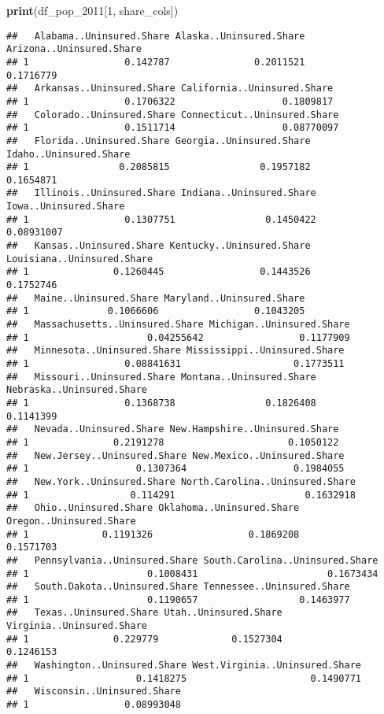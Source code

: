 \documentclass[
]{article}
\newenvironment{Shaded}{\begin{snugshade}}{\end{snugshade}}
\newcommand{\DecValTok}[1]{\textcolor[rgb]{0.00,0.00,0.81}{#1}}
\newcommand{\FunctionTok}[1]{\textcolor[rgb]{0.13,0.29,0.53}{\textbf{#1}}}
\newcommand{\NormalTok}[1]{#1}
\begin{document}
\begin{Shaded}
\begin{Highlighting}[]
\FunctionTok{print}\NormalTok{(df\_pop\_2011[}\DecValTok{1}\NormalTok{, share\_cols])}
\end{Highlighting}
\end{Shaded}

\begin{verbatim}
##   Alabama..Uninsured.Share Alaska..Uninsured.Share Arizona..Uninsured.Share
## 1                 0.142787               0.2011521                0.1716779
##   Arkansas..Uninsured.Share California..Uninsured.Share
## 1                 0.1706322                   0.1809817
##   Colorado..Uninsured.Share Connecticut..Uninsured.Share
## 1                 0.1511714                   0.08770097
##   Florida..Uninsured.Share Georgia..Uninsured.Share Idaho..Uninsured.Share
## 1                0.2085815                0.1957182              0.1654871
##   Illinois..Uninsured.Share Indiana..Uninsured.Share Iowa..Uninsured.Share
## 1                 0.1307751                0.1450422            0.08931007
##   Kansas..Uninsured.Share Kentucky..Uninsured.Share Louisiana..Uninsured.Share
## 1               0.1260445                 0.1443526                  0.1752746
##   Maine..Uninsured.Share Maryland..Uninsured.Share
## 1              0.1066606                 0.1043205
##   Massachusetts..Uninsured.Share Michigan..Uninsured.Share
## 1                     0.04255642                 0.1177909
##   Minnesota..Uninsured.Share Mississippi..Uninsured.Share
## 1                 0.08841631                    0.1773511
##   Missouri..Uninsured.Share Montana..Uninsured.Share Nebraska..Uninsured.Share
## 1                 0.1368738                0.1826408                 0.1141399
##   Nevada..Uninsured.Share New.Hampshire..Uninsured.Share
## 1               0.2191278                      0.1050122
##   New.Jersey..Uninsured.Share New.Mexico..Uninsured.Share
## 1                   0.1307364                   0.1984055
##   New.York..Uninsured.Share North.Carolina..Uninsured.Share
## 1                  0.114291                       0.1632918
##   Ohio..Uninsured.Share Oklahoma..Uninsured.Share Oregon..Uninsured.Share
## 1             0.1191326                 0.1869208               0.1571703
##   Pennsylvania..Uninsured.Share South.Carolina..Uninsured.Share
## 1                     0.1008431                       0.1673434
##   South.Dakota..Uninsured.Share Tennessee..Uninsured.Share
## 1                     0.1190657                  0.1463977
##   Texas..Uninsured.Share Utah..Uninsured.Share Virginia..Uninsured.Share
## 1               0.229779             0.1527304                 0.1246153
##   Washington..Uninsured.Share West.Virginia..Uninsured.Share
## 1                   0.1418275                      0.1490771
##   Wisconsin..Uninsured.Share
## 1                 0.08993048
\end{verbatim}
\end{document}

